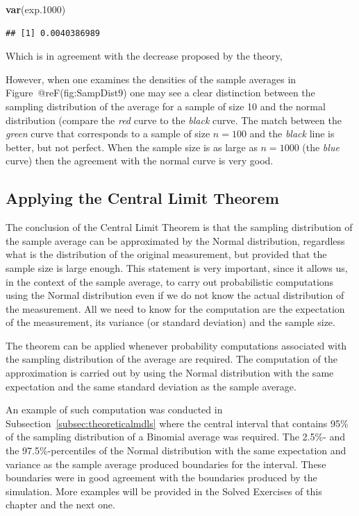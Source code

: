\documentclass[]{krantz}
\makeatletter
\newenvironment{Shaded}{\begin{snugshade}}{\end{snugshade}}
\newcommand{\KeywordTok}[1]{\textcolor[rgb]{0.13,0.29,0.53}{\textbf{#1}}}
\newcommand{\DecValTok}[1]{\textcolor[rgb]{0.00,0.00,0.81}{#1}}
\newcommand{\NormalTok}[1]{#1}
\newenvironment{kframe}{%
\medskip{}
\setlength{\fboxsep}{.8em}
 \def\at@end@of@kframe{}%
 \ifinner\ifhmode%
  \def\at@end@of@kframe{\end{minipage}}%
  \begin{minipage}{\columnwidth}%
 \fi\fi%
 \def\FrameCommand##1{\hskip\@totalleftmargin \hskip-\fboxsep
 \colorbox{shadecolor}{##1}\hskip-\fboxsep
     \hskip-\linewidth \hskip-\@totalleftmargin \hskip\columnwidth}%
 \MakeFramed {\advance\hsize-\width
   \@totalleftmargin\z@ \linewidth\hsize
   \@setminipage}}%
 {\par\unskip\endMakeFramed%
 \at@end@of@kframe}
\renewenvironment{Shaded}{\begin{kframe}}{\end{kframe}}
\theoremstyle{definition}
\theoremstyle{definition}
\theoremstyle{definition}
\theoremstyle{remark}
\makeatother
\begin{document}
\begin{Shaded}
\begin{Highlighting}[]
\KeywordTok{var}\NormalTok{(exp.}\DecValTok{1000}\NormalTok{)}
\end{Highlighting}
\end{Shaded}

\begin{verbatim}
## [1] 0.0040386989
\end{verbatim}

Which is in agreement with the decrease proposed by the theory,

However, when one examines the densities of the sample averages in
Figure~@reF(fig:SampDist9) one may see a clear distinction between the
sampling distribution of the average for a sample of size 10 and the
normal distribution (compare the \emph{red} curve to the \emph{black}
curve. The match between the \emph{green} curve that corresponds to a
sample of size \(n=100\) and the \emph{black} line is better, but not
perfect. When the sample size is as large as \(n=1000\) (the \emph{blue}
curve) then the agreement with the normal curve is very good.

\subsection{Applying the Central Limit
Theorem}\label{applying-the-central-limit-theorem}

The conclusion of the Central Limit Theorem is that the sampling
distribution of the sample average can be approximated by the Normal
distribution, regardless what is the distribution of the original
measurement, but provided that the sample size is large enough. This
statement is very important, since it allows us, in the context of the
sample average, to carry out probabilistic computations using the Normal
distribution even if we do not know the actual distribution of the
measurement. All we need to know for the computation are the expectation
of the measurement, its variance (or standard deviation) and the sample
size.

The theorem can be applied whenever probability computations associated
with the sampling distribution of the average are required. The
computation of the approximation is carried out by using the Normal
distribution with the same expectation and the same standard deviation
as the sample average.

An example of such computation was conducted in
Subsection~\ref{subsec:theoreticalmdls} where the central interval that
contains 95\% of the sampling distribution of a Binomial average was
required. The 2.5\%- and the 97.5\%-percentiles of the Normal
distribution with the same expectation and variance as the sample
average produced boundaries for the interval. These boundaries were in
good agreement with the boundaries produced by the simulation. More
examples will be provided in the Solved Exercises of this chapter and
the next one.
\end{document}
